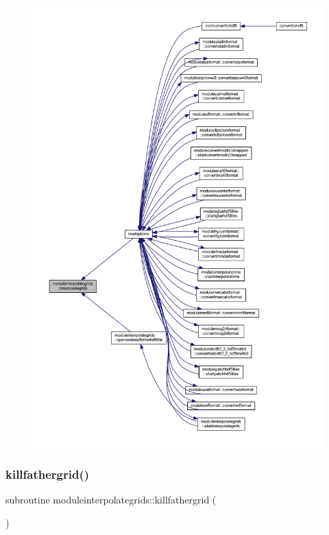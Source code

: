 \begin{figure}[H]
\begin{center}
\leavevmode
\includegraphics[width=350pt]{namespacemoduleinterpolategrids_a138eb9151410639c12869a99628fc486_icgraph}
\end{center}
\end{figure}
\mbox{\label{namespacemoduleinterpolategrids_a697db5b73722dba5d0ff54b8ac62f66a}} 
\subsubsection{\texorpdfstring{killfathergrid()}{killfathergrid()}}
{\footnotesize\ttfamily subroutine moduleinterpolategrids\+::killfathergrid (\begin{DoxyParamCaption}{ }\end{DoxyParamCaption})\hspace{0.3cm}{\ttfamily [private]}}

